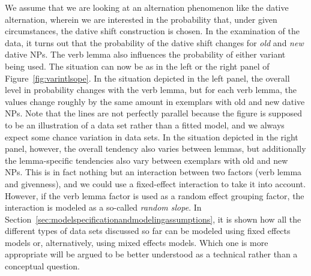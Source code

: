 We assume that we are looking at an alternation phenomenon like the dative alternation, wherein we are interested in the probability that, under given circumstances, the dative shift construction is chosen.
In the examination of the data, it turns out that the probability of the dative shift changes for \textit{old} and \textit{new} dative NPs.
The verb lemma also influences the probability of either variant being used.
The situation can now be as in the left or the right panel of Figure~\ref{fig:varintlsope}.
In the situation depicted in the left panel, the overall level in probability changes with the verb lemma, but for each verb lemma, the values change roughly by the same amount in exemplars with old and new dative NPs.
Note that the lines are not perfectly parallel because the figure is supposed to be an illustration of a data set rather than a fitted model, and we always expect some chance variation in data sets.
In the situation depicted in the right panel, however, the overall tendency also varies between lemmas, but additionally the lemma-specific tendencies also vary between exemplars with old and new NPs.
This is in fact nothing but an interaction between two factors (verb lemma and givenness), and we could use a fixed-effect interaction to take it into account.
However, if the verb lemma factor is used as a random effect grouping factor, the interaction is modeled as a so-called \textit{random slope}.
In Section~\ref{sec:modelspecificationandmodelingassumptions}, it is shown how all the different types of data sets discussed so far can be modeled using fixed effects models or, alternatively, using mixed effects models.
Which one is more appropriate will be argued to be better understood as a technical rather than a conceptual question.

